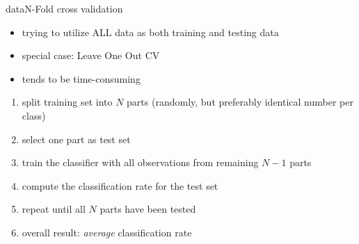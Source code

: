         \begin{frame}{data}{N-Fold cross validation}

            \begin{itemize}
                \item   trying to utilize ALL data as both training and testing data
                \item   special case: Leave One Out CV
                \item   tends to be time-consuming
            \end{itemize}
            \bigskip
            \begin{enumerate}
                \item<2->	split training set into $N$ parts (randomly, but preferably identical number per class)
                \item<3->	select one part as test set
                \item<4->	train the classifier with all observations from remaining $N-1$ parts
                \item<5->	compute the classification rate for the test set
                \item<6->	repeat until all $N$ parts have been tested
                \item<7->	overall result: \textit{average} classification rate
            \end{enumerate}
        \end{frame}
        
